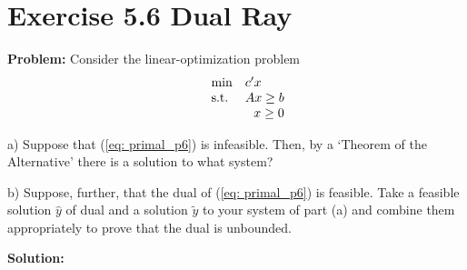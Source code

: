 \section{Exercise 5.6 Dual Ray}
\textbf{Problem:} Consider the linear-optimization problem
\begin{equation}
\label{eq: primal_p6}
  \begin{array}{lrcll}
    \min
    & \multicolumn{4}{l}{c'x} \\
    \text{s.t.}
    & Ax\geq b \\
    & x \geq 0
  \end{array}
\end{equation}

a) Suppose that (\ref{eq: primal_p6}) is infeasible. Then, by a `Theorem of the Alternative' there is a
solution to what system?

b) Suppose, further, that the dual of (\ref{eq: primal_p6}) is feasible. Take a feasible solution $\widehat{y}$ of dual and a solution $\tilde{y}$ to your system of part (a) and combine them appropriately to prove that the dual is unbounded.

\textbf{Solution:}